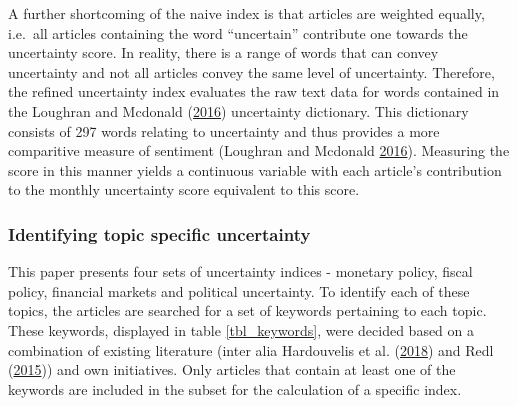 \documentclass[11pt,preprint, authoryear]{elsarticle}
\numberwithin{equation}{section}
\numberwithin{figure}{section}
\numberwithin{table}{section}
\begin{document}
A further shortcoming of the naive index is that articles are weighted
equally, i.e.~all articles containing the word ``uncertain'' contribute
one towards the uncertainty score. In reality, there is a range of words
that can convey uncertainty and not all articles convey the same level
of uncertainty. Therefore, the refined uncertainty index evaluates the
raw text data for words contained in the Loughran and Mcdonald
(\protect\hyperlink{ref-Loughran2016}{2016}) uncertainty dictionary.
This dictionary consists of 297 words relating to uncertainty and thus
provides a more comparitive measure of sentiment (Loughran and Mcdonald
\protect\hyperlink{ref-Loughran2016}{2016}). Measuring the score in this
manner yields a continuous variable with each article's contribution to
the monthly uncertainty score equivalent to this score.

\subsubsection{\texorpdfstring{Identifying topic specific uncertainty
\label{ss_topics}}{Identifying topic specific uncertainty }}\label{identifying-topic-specific-uncertainty}

This paper presents four sets of uncertainty indices - monetary policy,
fiscal policy, financial markets and political uncertainty. To identify
each of these topics, the articles are searched for a set of keywords
pertaining to each topic. These keywords, displayed in table
\ref{tbl_keywords}, were decided based on a combination of existing
literature (inter alia Hardouvelis et al.
(\protect\hyperlink{ref-Hardouvelis2018}{2018}) and Redl
(\protect\hyperlink{ref-Redl2015}{2015})) and own initiatives. Only
articles that contain at least one of the keywords are included in the
subset for the calculation of a specific index.
\end{document}
